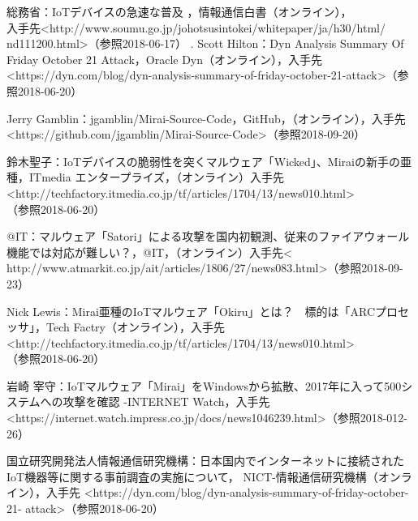 
\begin{thebibliography}{30}
		総務省：IoTデバイスの急速な普及 ，情報通信白書（オンライン），\\入手先\textless http://www.soumu.go.jp/johotsusintokei/whitepaper/ja/h30/html/ \\nd111200.html\textgreater（参照2018-06-17）
   .
       Scott Hilton：Dyn Analysis Summary Of Friday October 21 Attack，Oracle Dyn（オンライン），入手先\textless https:\slash\slash{}dyn.com\slash{}blog\slash{}dyn-analysis-summary-of-friday-october-21-attack\textgreater （参照2018-06-20）
       
       Jerry Gamblin：jgamblin/Mirai-Source-Code，GitHub，（オンライン），入手先\textless https://github.com/jgamblin/Mirai-Source-Code\textgreater（参照2018-09-20）
    
       鈴木聖子：IoTデバイスの脆弱性を突くマルウェア「Wicked」、Miraiの新手の亜種，ITmedia エンタープライズ，（オンライン）入手先\textless http:\slash\slash{}techfactory.itmedia.co.jp\slash{}tf\slash{}articles\slash{}1704\slash{}13\slash{}news010.html\textgreater\\（参照2018-06-20）
   
       @IT：マルウェア「Satori」による攻撃を国内初観測、従来のファイアウォール機能では対応が難しい？，@IT，（オンライン）入手先\textless 
       http:\slash\slash{}www.atmarkit.co.jp\slash{}ait\slash{}articles\slash{}1806\slash{}27\slash{}news083.html\textgreater （参照2018-09-23）

       Nick Lewis：Mirai亜種のIoTマルウェア「Okiru」とは？　標的は「ARCプロセッサ」，Tech Factry（オンライン），入手先\textless http:\slash\slash{}techfactory.itmedia.co.jp\slash{}tf\slash{}articles\slash{}1704\slash{}13\slash{}news010.html\textgreater\\（参照2018-06-20）

       岩崎 宰守：IoTマルウェア「Mirai」をWindowsから拡散、2017年に入って500システムへの攻撃を確認 -INTERNET Watch，入手先\textless https:\slash\slash{}internet.watch.impress.co.jp\slash{}docs\slash{}news1046239.html\textgreater（参照2018-012-26）
    
        国立研究開発法人情報通信研究機構：日本国内でインターネットに接続されたIoT機器等に関する事前調査の実施について， NICT-情報通信研究機構（オンライン），入手先 \textless https:\slash\slash{}dyn.com\slash{}blog\slash{}dyn-analysis-summary-of-friday-october-21-
        attack\textgreater （参照2018-06-20）
        

\end{thebibliography}
